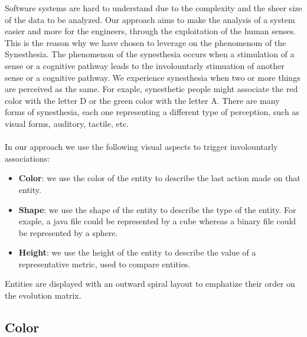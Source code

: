 Software systems are hard to understand due to the complexity and the sheer size of the data to be analyzed.
Our approach aims to make the analysis of a system easier and more for the engineers, through the exploitation of the human senses.
This is the reason why we have chosen to leverage on the phenomenom of the Synesthesia.
The phenomenon of the synesthesia occurs  when a stimulation of a sense or a cognitive pathway leads to the involountarly stimuation of another sense or a cognitive pathway.
We experience synesthesia when two or more things are perceived as the same. 
For exaple, synesthetic people might associate the red color with the letter D or the green color with the letter A. 
There are many forms of synesthesia, each one representing a different type of perception, such as visual forms, auditory, tactile, etc.\\
\\
In our approach we use the following visual aspects to trigger involountarly associations:
\begin{itemize}
    \item \textbf{Color}: we use the color of the entity to describe the last action made on that entity.
    \item \textbf{Shape}: we use the shape of the entity to describe the type of the entity. 
    For exaple, a java file could be represented by a cube whereas a binary file could be represented by a sphere.
    \item \textbf{Height}: we use the height of the entity to describe the value of a representative metric, used to compare entities.
\end{itemize}

Entities are displayed with an outward spiral layout to emphatize their order on the evolution matrix. 

\subsection*{Color}


